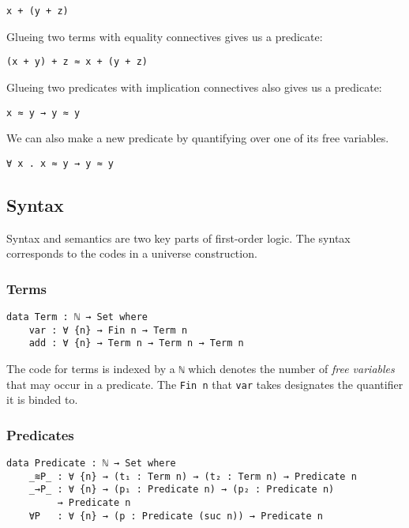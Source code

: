 \documentclass[\main/thesis.tex]{subfiles}
\begin{document}
\begin{lstlisting}
x + (y + z)
\end{lstlisting}

Glueing two terms with equality connectives gives us a predicate:

\begin{lstlisting}
(x + y) + z ≈ x + (y + z)
\end{lstlisting}

Glueing two predicates with implication connectives also gives us a predicate:

\begin{lstlisting}
x ≈ y → y ≈ y
\end{lstlisting}

We can also make a new predicate by quantifying over one of its
free variables.

\begin{lstlisting}
∀ x . x ≈ y → y ≈ y
\end{lstlisting}


\subsection{Syntax}

Syntax and semantics are two key parts of first-order logic.
The syntax corresponds to the codes in a universe construction.

\subsubsection{Terms}

\begin{lstlisting}
data Term : ℕ → Set where
    var : ∀ {n} → Fin n → Term n
    add : ∀ {n} → Term n → Term n → Term n
\end{lstlisting}

The code for terms is indexed by a \lstinline|ℕ| which denotes the number
of \textit{free variables} that may occur in a predicate.
The \lstinline|Fin n| that \lstinline|var| takes designates the quantifier it is
binded to.

\subsubsection{Predicates}

\begin{lstlisting}
data Predicate : ℕ → Set where
    _≋P_ : ∀ {n} → (t₁ : Term n) → (t₂ : Term n) → Predicate n
    _→P_ : ∀ {n} → (p₁ : Predicate n) → (p₂ : Predicate n)
         → Predicate n
    ∀P   : ∀ {n} → (p : Predicate (suc n)) → Predicate n
\end{lstlisting}
\end{document}
